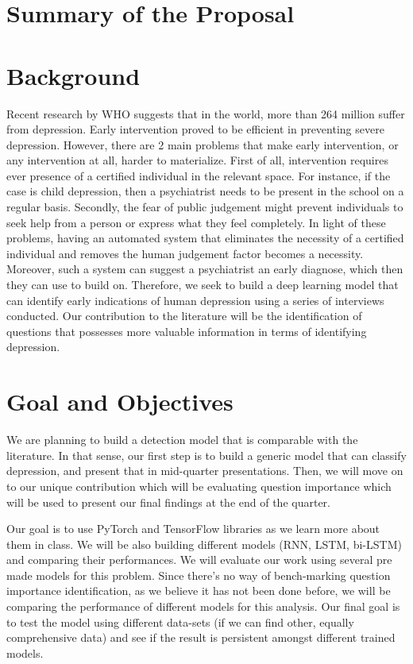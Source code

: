 
\newpage

\tableofcontents

\newpage

\section{Summary of the Proposal}



\section{Background}

Recent research by WHO suggests that in the world, more than 264 million suffer from depression. Early intervention proved to be efficient in preventing severe depression. However, there are 2 main problems that make early intervention, or any intervention at all, harder to materialize. First of all, intervention requires ever presence of a certified individual in the relevant space. For instance, if the case is child depression, then a psychiatrist needs to be present in the school on a regular basis. Secondly, the fear of public judgement might prevent individuals to seek help from a person or express what they feel completely. In light of these problems, having an automated system that eliminates the necessity of a certified individual and removes the human judgement factor becomes a necessity. Moreover, such a system can suggest a psychiatrist an early diagnose, which then they can use to build on. Therefore, we seek to build a deep learning model that can identify early indications of human depression using a series of interviews conducted. Our contribution to the literature will be the identification of questions that possesses more valuable information in terms of identifying depression.  

\section{Goal and Objectives}

We are planning to build a detection model that is comparable with the literature. In that sense, our first step is to build a generic model that can classify depression, and present that in mid-quarter presentations. Then, we will move on to our unique contribution which will be evaluating question importance which will be used to present our final findings at the end of the quarter.

Our goal is to use PyTorch and TensorFlow libraries as we learn more about them in class. We will be also building different models (RNN, LSTM, bi-LSTM) and comparing their performances. We will evaluate our work using several pre made models for this problem. Since there's no way of bench-marking question importance identification, as we believe it has not been done before, we will be comparing the performance of different models for this analysis. Our final goal is to test the model using different data-sets (if we can find other, equally comprehensive data) and see if the result is persistent amongst different trained models.

